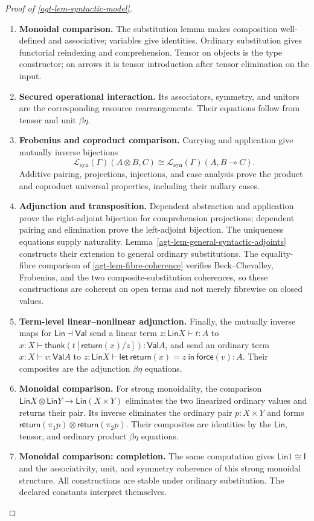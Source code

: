 \documentclass[11pt,a4paper]{article}
\numberwithin{equation}{section}
\theoremstyle{definition}
\theoremstyle{remark}
\theoremstyle{plain}
\providecommand{\Lin}{\mathsf{Lin}}
\providecommand{\Val}{\mathsf{Val}}
\providecommand{\I}{\mathsf{I}}
\providecommand{\cL}{\mathcal{L}}
\begin{document}
\begin{proof}[Proof of \cref{agt-lem-syntactic-model}]
\leavevmode
\begin{enumerate}[label=\textup{(\arabic*)},leftmargin=*,itemsep=4pt,topsep=3pt]
  \item \textbf{Monoidal comparison.} The substitution lemma makes composition well-defined and associative;
variables give identities. Ordinary substitution gives functorial
reindexing and comprehension. Tensor on objects is the type constructor;
on arrows it is tensor introduction after tensor elimination on the input.
  \item \textbf{Secured operational interaction.} Its associators, symmetry, and unitors are the corresponding resource
rearrangements. Their equations follow from tensor and unit $\beta\eta$.
  \item \textbf{Frobenius and coproduct comparison.} Currying and application give mutually inverse bijections
\[
 \cL_{\mathrm{syn}}(\Gamma)(A\otimes B,C)
 \cong\cL_{\mathrm{syn}}(\Gamma)(A,B\multimap C).
\]
Additive pairing, projections, injections, and case analysis prove the
product and coproduct universal properties, including their nullary cases.
  \item \textbf{Adjunction and transposition.} Dependent abstraction and application prove the right-adjoint bijection
for comprehension projections; dependent pairing and elimination prove
the left-adjoint bijection. The uniqueness equations supply naturality. Lemma~\ref{agt-lem-general-syntactic-adjoints} constructs their extension
to general ordinary substitutions. The equality-fibre comparison of
\cref{agt-lem-fibre-coherence} verifies Beck--Chevalley, Frobenius,
and the two composite-substitution coherences, so these constructions
are coherent on open terms and not merely fibrewise on closed values.
  \item \textbf{Term-level linear--nonlinear adjunction.} Finally, the mutually inverse maps for $\Lin\dashv\Val$ send a linear
term $z:\Lin X\vdash t:A$ to
$x:X\vdash\mathsf{thunk}(t[\mathsf{return}(x)/z]):\Val A$, and send
an ordinary term $x:X\vdash v:\Val A$ to
$z:\Lin X\vdash\mathsf{let}\ \mathsf{return}(x)=z\ \mathsf{in}\
\mathsf{force}(v):A$. Their composites are the adjunction $\beta\eta$
equations.
  \item \textbf{Monoidal comparison.} For strong monoidality, the comparison
$\Lin X\otimes\Lin Y\to\Lin(X\times Y)$ eliminates the two
linearized ordinary values and returns their pair. Its inverse eliminates
the ordinary pair $p:X\times Y$ and forms
$\mathsf{return}(\pi_1p)\otimes\mathsf{return}(\pi_2p)$. Their composites are identities by the $\Lin$, tensor, and ordinary
product $\beta\eta$ equations.
  \item \textbf{Monoidal comparison: completion.} The same computation gives
$\Lin1\cong\I$ and the associativity, unit, and symmetry coherence
of this strong monoidal structure. All constructions are stable under ordinary substitution. The declared constants interpret themselves.
\end{enumerate}
\end{proof}
\end{document}
